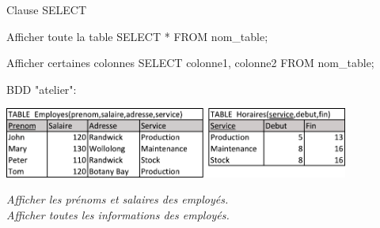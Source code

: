 \documentclass[xetex,dvipsnames]{beamer}
\begin{document}
\begin{frame}{Clause SELECT}
	\begin{alertblock}{Afficher toute la table}
		SELECT * FROM nom\_table;
	\end{alertblock}
	\begin{alertblock}{Afficher certaines colonnes}
		SELECT colonne1, colonne2 FROM nom\_table;
	\end{alertblock}
	
\begin{scriptsize}
	BDD "atelier":
 	\begin{center}
	    	\includegraphics[width=0.85\textwidth]{./figures/BDDatelier.pdf}
	\end{center}
		\textit{Afficher les prénoms et salaires des employés.}\\
		\textit{Afficher toutes les informations des employés.}
\end{scriptsize}
\end{frame}
\end{document}
